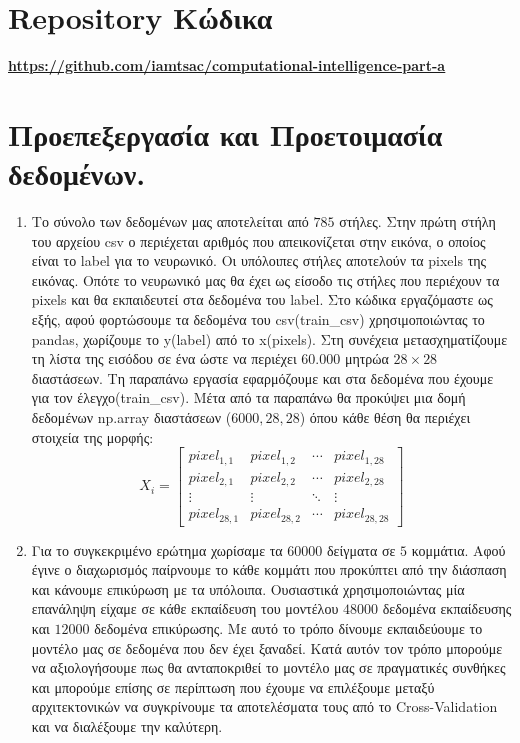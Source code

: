 \documentclass[12pt,a4paper]{article}
\author{Κωνσταντίνος Τσάκωνας \\ Α.Μ.: 1059666}
\date{Ακαδημαϊκό έτος 2020-21\\ Χειμερινό Εξάμηνο}
\newcommand{\tl}{\textlatin}
\newcommand{\gr}{\selectlanguage{greek}}
\begin{document}
    \gr \maketitle \newpage

    \tableofcontents  \newpage

    \section{\tl{Repository} \gr Κώδικα}
        \underline{\tl{\textbf{\url{https://github.com/iamtsac/computational-intelligence-part-a}}}}

    \section{Προεπεξεργασία και Προετοιμασία δεδομένων.} 
    \begin{enumerate}
        \item 
        Το σύνολο των δεδομένων μας αποτελείται από $785$ στήλες. Στην πρώτη στήλη του αρχείου \tl{csv} ο περιέχεται αριθμός που απεικονίζεται στην εικόνα, ο οποίος είναι το  \tl{label} για το νευρωνικό. Οι υπόλοιπες στήλες αποτελούν τα \tl{pixels} της εικόνας. Οπότε το νευρωνικό μας θα έχει ως είσοδο τις στήλες που περιέχουν τα \tl{pixels} και θα εκπαιδευτεί στα δεδομένα του \tl{label}. Στο κώδικα εργαζόμαστε ως εξής, αφού φορτώσουμε τα δεδομένα του \tl{csv(train\_csv)} χρησιμοποιώντας το pandas, χωρίζουμε το \tl{y(label)} από το \tl{x(pixels)}. Στη συνέχεια μετασχηματίζουμε τη λίστα της εισόδου σε ένα ώστε να περιέχει $60.000$ μητρώα $28\times28$ διαστάσεων. Τη παραπάνω εργασία εφαρμόζουμε και στα δεδομένα που έχουμε για τον έλεγχο(\tl{train\_csv}). Μέτα από τα παραπάνω θα προκύψει μια δομή δεδομένων \tl{np.array} διαστάσεων ($6000,28,28$) όπου κάθε θέση θα περιέχει στοιχεία της μορφής:
        \begin{equation*}
        X_i = 
        \begin{bmatrix}
            pixel_{1,1} & pixel_{1,2} & \cdots & pixel_{1,28} \\
            pixel_{2,1} & pixel_{2,2} & \cdots & pixel_{2,28} \\
            \vdots      & \vdots      & \ddots & \vdots  \\
            pixel_{28,1} & pixel_{28,2} & \cdots & pixel_{28,28} 
        \end{bmatrix} 
        \end{equation*}
        \item Για το συγκεκριμένο ερώτημα χωρίσαμε τα $60000$ δείγματα σε $5$ κομμάτια. Αφού έγινε ο διαχωρισμός παίρνουμε το κάθε κομμάτι που προκύπτει από την διάσπαση και κάνουμε επικύρωση με τα υπόλοιπα. Ουσιαστικά χρησιμοποιώντας μία επανάληψη είχαμε σε κάθε εκπαίδευση του μοντέλου $48000$ δεδομένα εκπαίδευσης και $12000$ δεδομένα επικύρωσης. Με αυτό το τρόπο δίνουμε εκπαιδεύουμε το μοντέλο μας σε δεδομένα που δεν έχει ξαναδεί. Κατά αυτόν τον τρόπο μπορούμε να αξιολογήσουμε πως θα ανταποκριθεί το μοντέλο μας σε πραγματικές συνθήκες και μπορούμε επίσης σε περίπτωση που έχουμε να επιλέξουμε μεταξύ αρχιτεκτονικών να συγκρίνουμε τα αποτελέσματα τους από το \tl{Cross-Validation } και να διαλέξουμε την καλύτερη.
    \end{enumerate}
\end{document}
